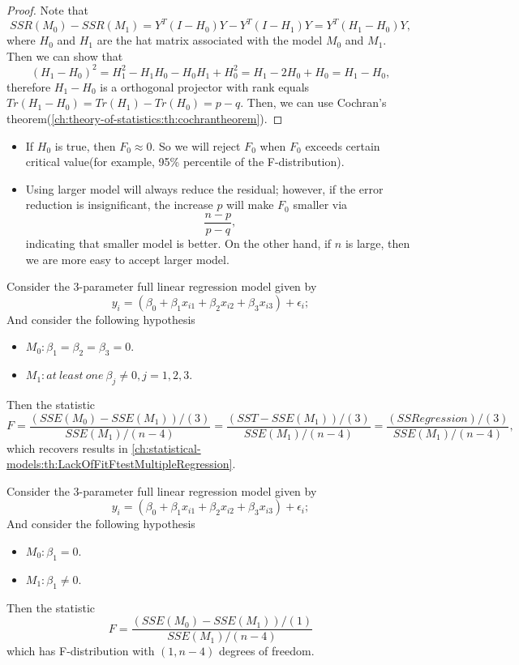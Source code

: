 \begin{refsection}
\begin{theorem}
\end{theorem}
\begin{proof}
	Note that $$SSR(M_0) - SSR(M_1) = Y^T(I-H_0)Y - Y^T(I-H_1)Y = Y^T(H_1-H_0)Y,$$
	where $H_0$ and $H_1$ are the hat matrix associated with the model $M_0$ and $M_1$. Then we can show that
	$$(H_1-H_0)^2=H_1^2-H_1H_0-H_0H_1 + H_0^2 = H_1 - 2H_0 + H_0 = H_1-H_0,$$
	therefore $H_1-H_0$ is a orthogonal projector with rank equals $Tr(H_1-H_0) = Tr(H_1)-Tr(H_0) = p-q$. Then, we can use Cochran's theorem(\autoref{ch:theory-of-statistics:th:cochrantheorem}).
\end{proof}



\begin{remark}\hfill
	\begin{itemize}
		\item If $H_0$ is true, then $F_0 \approx 0$. So we will reject $F_0$ when $F_0$ exceeds certain critical value(for example, 95\% percentile of the F-distribution).
		\item Using larger model will always reduce the residual; however, if the error reduction is insignificant, the increase $p$ will make $F_0$ smaller via $$\frac{n-p}{p-q},$$ indicating that smaller model is better. On the other hand, if $n$ is large, then we are more easy to accept larger model. 
	\end{itemize}	
\end{remark}


\begin{example}
Consider the 3-parameter full linear regression model given by
	$$y_i = (\beta_0 + \beta_1 x_{i1} + \beta_2 x_{i2} + \beta_3 x_{i3}) + \epsilon_i;$$
And consider the following hypothesis
\begin{itemize}
	\item $M_0: \beta_1 = \beta_2 = \beta_3 = 0$.
	\item $M_1: at~least~one~\beta_j \neq 0, j=1,2,3$.
\end{itemize}
Then the statistic
$$F = \frac{(SSE(M_0) - SSE(M_1))/(3)}{SSE(M_1)/(n-4)} = \frac{(SST - SSE(M_1))/(3)}{SSE(M_1)/(n-4)} =  \frac{(SSRegression)/(3)}{SSE(M_1)/(n-4)},$$
which recovers results in \autoref{ch:statistical-models:th:LackOfFitFtestMultipleRegression}.	
\end{example}

\begin{example}
	Consider the 3-parameter full linear regression model given by
	$$y_i = (\beta_0 + \beta_1 x_{i1} + \beta_2 x_{i2} + \beta_3 x_{i3}) + \epsilon_i;$$
	And consider the following hypothesis
	\begin{itemize}
		\item $M_0: \beta_1 =  0$.
		\item $M_1: \beta_1 \neq 0$.
	\end{itemize}
	Then the statistic
	$$F = \frac{(SSE(M_0) - SSE(M_1))/(1)}{SSE(M_1)/(n-4)}$$
	which has F-distribution with $(1,n-4)$ degrees of freedom. 	
\end{example}



\end{refsection}
